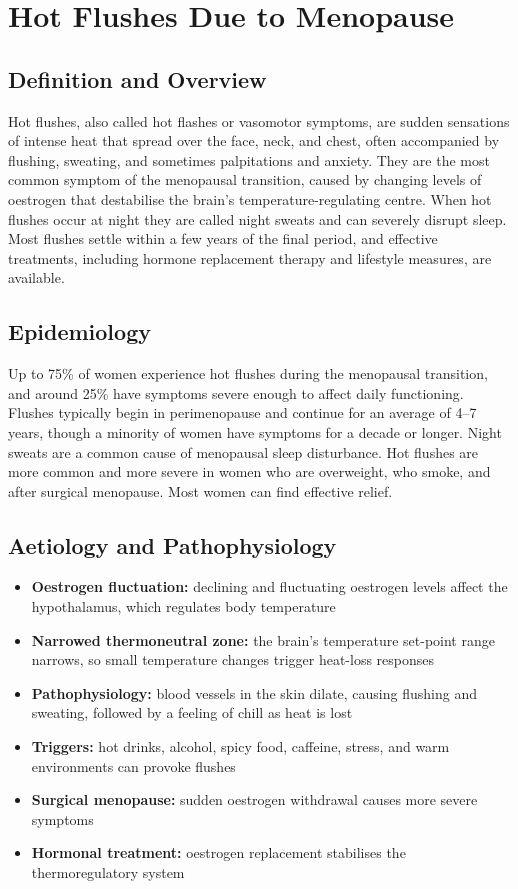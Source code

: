 \chapter{Hot Flushes Due to Menopause}

\section*{Definition and Overview}
Hot flushes, also called hot flashes or vasomotor symptoms, are sudden sensations of intense heat that spread over the face, neck, and chest, often accompanied by flushing, sweating, and sometimes palpitations and anxiety. They are the most common symptom of the menopausal transition, caused by changing levels of oestrogen that destabilise the brain's temperature-regulating centre. When hot flushes occur at night they are called night sweats and can severely disrupt sleep. Most flushes settle within a few years of the final period, and effective treatments, including hormone replacement therapy and lifestyle measures, are available.

\section*{Epidemiology}
Up to 75\% of women experience hot flushes during the menopausal transition, and around 25\% have symptoms severe enough to affect daily functioning. Flushes typically begin in perimenopause and continue for an average of 4--7 years, though a minority of women have symptoms for a decade or longer. Night sweats are a common cause of menopausal sleep disturbance. Hot flushes are more common and more severe in women who are overweight, who smoke, and after surgical menopause. Most women can find effective relief.

\section*{Aetiology and Pathophysiology}
\begin{itemize}
    \item \textbf{Oestrogen fluctuation:} declining and fluctuating oestrogen levels affect the hypothalamus, which regulates body temperature
    \item \textbf{Narrowed thermoneutral zone:} the brain's temperature set-point range narrows, so small temperature changes trigger heat-loss responses
    \item \textbf{Pathophysiology:} blood vessels in the skin dilate, causing flushing and sweating, followed by a feeling of chill as heat is lost
    \item \textbf{Triggers:} hot drinks, alcohol, spicy food, caffeine, stress, and warm environments can provoke flushes
    \item \textbf{Surgical menopause:} sudden oestrogen withdrawal causes more severe symptoms
    \item \textbf{Hormonal treatment:} oestrogen replacement stabilises the thermoregulatory system
\end{itemize}


